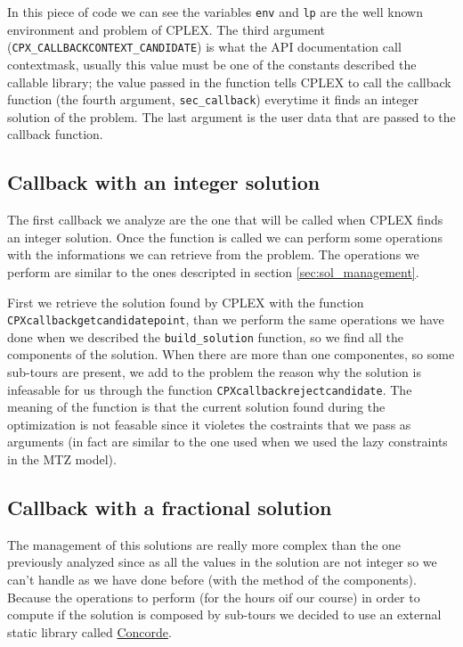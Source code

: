 In this piece of code we can see the variables \verb|env| and \verb|lp| are the well known environment and problem of CPLEX. The third argument (\verb|CPX_CALLBACKCONTEXT_CANDIDATE|) is what the API documentation call contextmask, usually this value must be one of the constants described the callable library; the value passed in the function tells CPLEX to call the callback function (the fourth argument, \verb|sec_callback|) everytime it finds an integer solution of the problem. The last argument is the user data that are passed to the callback function.


\subsection{Callback with an integer solution}
The first callback we analyze are the one that will be called when CPLEX finds an integer solution. Once the function is called we can perform some operations with the informations we can retrieve from the problem. The operations we perform are similar to the ones descripted in section \ref{sec:sol_management}.

First we retrieve the solution found by CPLEX with the function \verb|CPXcallbackgetcandidatepoint|, than we perform the same operations we have done when we described the \verb|build_solution| function, so we find all the components of the solution. When there are more than one componentes, so some sub-tours are present, we add to the problem the reason why the solution is infeasable for us through the function \verb|CPXcallbackrejectcandidate|. The meaning of the function is that the current solution found during the optimization is not feasable since it violetes the costraints that we pass as arguments (in fact are similar to the one used when we used the lazy constraints in the MTZ model).

\subsection{Callback with a fractional solution}
The management of this solutions are really more complex than the one previously analyzed since as all the values in the solution are not integer so we can't handle as we have done before (with the method of the components). Because the operations to perform (for the hours oif our course) in order to compute if the solution is composed by sub-tours we decided to use an external static library called \href{https://www.math.uwaterloo.ca/tsp/concorde.html}{Concorde}.

